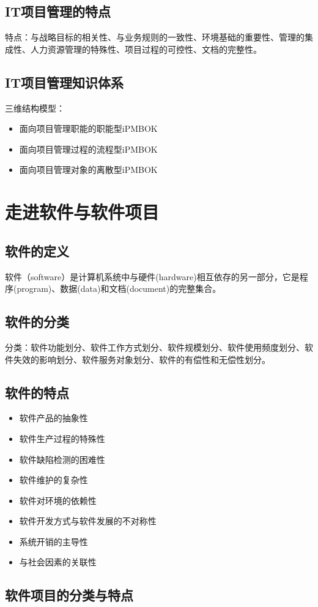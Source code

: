 \subsection{IT项目管理的特点}
特点：与战略目标的相关性、与业务规则的一致性、环境基础的重要性、管理的集成性、人力资源管理的特殊性、项目过程的可控性、文档的完整性。
\subsection{IT项目管理知识体系}
三维结构模型：
\begin{itemize}
	\item 面向项目管理职能的职能型iPMBOK
	\item 面向项目管理过程的流程型iPMBOK
	\item 面向项目管理对象的离散型iPMBOK
\end{itemize}
\section{走进软件与软件项目}
\subsection{软件的定义}
软件（software）是计算机系统中与硬件(hardware)相互依存的另一部分，它是程序(program)、数据(data)和文档(document)的完整集合。
\subsection{软件的分类}
分类：软件功能划分、软件工作方式划分、软件规模划分、软件使用频度划分、软件失效的影响划分、软件服务对象划分、软件的有偿性和无偿性划分。
\subsection{软件的特点}
\begin{itemize}
	\item 软件产品的抽象性
	\item 软件生产过程的特殊性
	\item 软件缺陷检测的困难性
	\item 软件维护的复杂性
	\item 软件对环境的依赖性
	\item 软件开发方式与软件发展的不对称性
	\item 系统开销的主导性
	\item 与社会因素的关联性
\end{itemize}
\subsection{软件项目的分类与特点}

